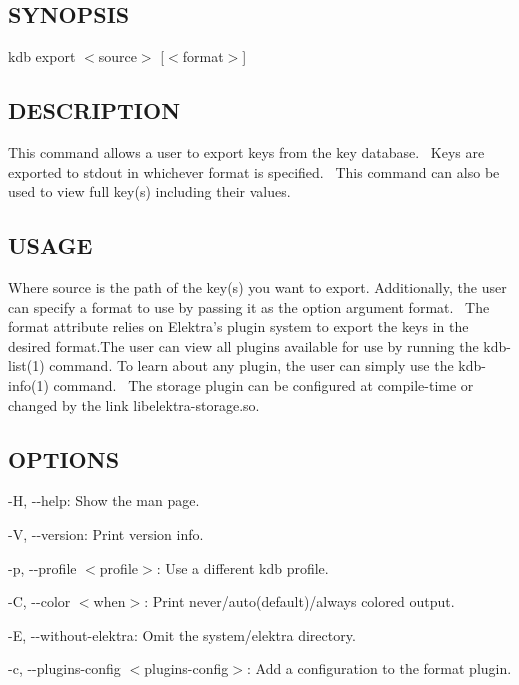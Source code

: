 \subsection*{S\+Y\+N\+O\+P\+S\+IS}

{\ttfamily kdb export $<$source$>$ \mbox{[}$<$format$>$\mbox{]}}~\newline


\subsection*{D\+E\+S\+C\+R\+I\+P\+T\+I\+ON}

This command allows a user to export keys from the key database.~\newline
 Keys are exported to {\ttfamily stdout} in whichever format is specified.~\newline
 This command can also be used to view full key(s) including their values.~\newline


\subsection*{U\+S\+A\+GE}

Where {\ttfamily source} is the path of the key(s) you want to export. Additionally, the user can specify a format to use by passing it as the option argument {\ttfamily format}.~\newline
 The {\ttfamily format} attribute relies on Elektra’s plugin system to export the keys in the desired format.\+The user can view all plugins available for use by running the kdb-\/list(1) command. To learn about any plugin, the user can simply use the kdb-\/info(1) command.~\newline
 The {\ttfamily storage} plugin can be configured at compile-\/time or changed by the link {\ttfamily libelektra-\/storage.\+so}.

\subsection*{O\+P\+T\+I\+O\+NS}


\begin{DoxyItemize}
\item {\ttfamily -\/H}, {\ttfamily -\/-\/help}\+: Show the man page.
\item {\ttfamily -\/V}, {\ttfamily -\/-\/version}\+: Print version info.
\item {\ttfamily -\/p}, {\ttfamily -\/-\/profile $<$profile$>$}\+: Use a different kdb profile.
\item {\ttfamily -\/C}, {\ttfamily -\/-\/color $<$when$>$}\+: Print never/auto(default)/always colored output.
\item {\ttfamily -\/E}, {\ttfamily -\/-\/without-\/elektra}\+: Omit the {\ttfamily system/elektra} directory.
\item {\ttfamily -\/c}, {\ttfamily -\/-\/plugins-\/config $<$plugins-\/config$>$}\+: Add a configuration to the format plugin.
\end{DoxyItemize}

